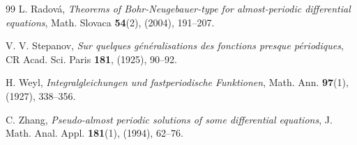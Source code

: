 \documentclass[11pt]{amsart}
\begin{document}
\begin{thebibliography}{99}
L. Radov\'a,
\emph{Theorems of Bohr-Neugebauer-type for almost-periodic differential equations},
Math. Slovaca \textbf{54}(2), (2004), 191--207.

V. V. Stepanov,
\emph{Sur quelques g\'en\'eralisations des fonctions presque p\'eriodiques},
CR Acad. Sci. Paris \textbf{181}, (1925), 90--92.

H. Weyl,
\emph{Integralgleichungen und fastperiodische Funktionen},
Math. Ann. \textbf{97}(1), (1927), 338--356.

C. Zhang,
\emph{Pseudo-almost periodic solutions of some differential equations},
J. Math. Anal. Appl. \textbf{181}(1), (1994), 62--76.

\end{thebibliography}
\end{document}
